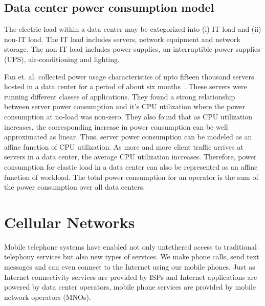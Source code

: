 \subsection{Data center power consumption model} 
The electric load within a data center may be categorized into (i) IT load and (ii) non-IT load. The IT load includes servers, network equipment and network storage. The non-IT load includes power supplies, un-interruptible power supplies (UPS), air-conditioning and lighting. 

Fan et. al. collected power usage characteristics of upto fifteen thousand servers hosted in a data center for a period of about six months~\cite{Fan:power:ICSA:2007}. These servers were running different classes of applications. They found a strong relationship between server power consumption and it's CPU utilization where the power consumption at no-load was non-zero. They also found that as CPU utilization increases, the corresponding increase in power consumption can be well approximated as linear. Thus, server power consumption can be modeled as an affine function of CPU utilization. As more and more client traffic arrives at servers in a data center, the average CPU utilization increases. Therefore, power consumption for elastic load in a data center can also be represented as an affine function of workload. The total power consumption for an operator is the sum of the power consumption over all data centers. 

\section{Cellular Networks} %
Mobile telephone systems have enabled not only untethered access to traditional telephony services but also new types of services. We make phone calls, send text messages and can even connect to the Internet using our mobile phones. Just as Internet connectivity services are provided by ISPs and Internet applications are powered by data center operators, mobile phone services are provided by mobile network operators (MNOs).  

